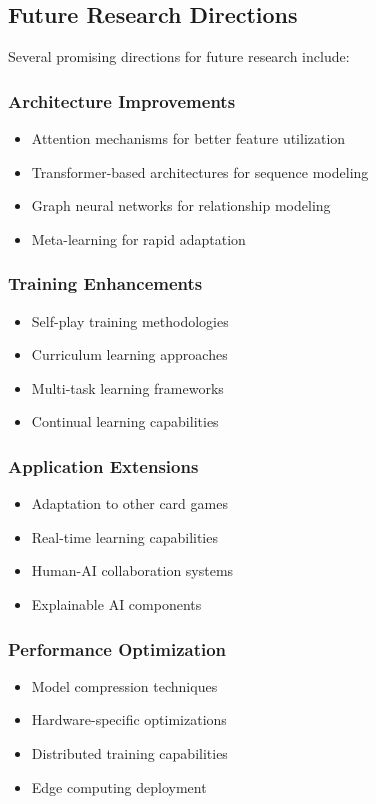 \documentclass[conference]{IEEEtran}
\begin{document}
\subsection{Future Research Directions}

Several promising directions for future research include:

\subsubsection{Architecture Improvements}
\begin{itemize}
    \item Attention mechanisms for better feature utilization
    \item Transformer-based architectures for sequence modeling
    \item Graph neural networks for relationship modeling
    \item Meta-learning for rapid adaptation
\end{itemize}

\subsubsection{Training Enhancements}
\begin{itemize}
    \item Self-play training methodologies
    \item Curriculum learning approaches
    \item Multi-task learning frameworks
    \item Continual learning capabilities
\end{itemize}

\subsubsection{Application Extensions}
\begin{itemize}
    \item Adaptation to other card games
    \item Real-time learning capabilities
    \item Human-AI collaboration systems
    \item Explainable AI components
\end{itemize}

\subsubsection{Performance Optimization}
\begin{itemize}
    \item Model compression techniques
    \item Hardware-specific optimizations
    \item Distributed training capabilities
    \item Edge computing deployment
\end{itemize}
\end{document}
